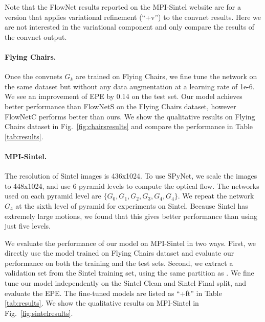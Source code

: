 \documentclass[10pt,twocolumn,letterpaper]{article}
\begin{document}
Note that the FlowNet results reported on the MPI-Sintel website are for a version that applies variational refinement (``+v'') to the convnet results.
Here we are not interested in the variational component and only compare the results of the convnet output.

\paragraph{Flying Chairs.}
Once the convnets $G_k$ are trained on Flying Chairs, we fine tune the network on the same dataset but without any data augmentation at a learning rate of 1e-6. 
We see an improvement of EPE by 0.14 on the test set. 
Our model achieves better performance than FlowNetS \cite{dosovitskiy2015flownet} on the Flying Chairs dataset, however FlowNetC \cite{dosovitskiy2015flownet} performs better than ours. 
We show the qualitative results on Flying Chairs dataset in Fig.~\ref{fig:chairsresults} and compare the performance in Table \ref{tab:results}.

\paragraph{MPI-Sintel.}
The resolution of Sintel images is 436x1024. 
To use SPyNet, we scale the images to 448x1024, and use 6 pyramid levels to compute the optical flow. The networks used on each pyramid level are $\{G_0, G_1, G_2, G_3, G_4, G_4\}$. We repeat the network $G_4$ at the sixth level of pyramid for experiments on Sintel. 
Because Sintel has extremely large motions, we found that this gives better performance than using just five levels.

We evaluate the performance of our model on MPI-Sintel \cite{Butler:ECCV:2012} in two ways.
First, we directly use the model trained on Flying Chairs dataset and evaluate our performance on both the training and the test sets. 
Second, we extract a validation set from the Sintel training set, using  the same partition as \cite{dosovitskiy2015flownet}. 
We fine tune our model independently on the Sintel Clean and Sintel Final split, and evaluate the EPE. 
The fine-tuned models are listed as ``+ft'' in Table \ref{tab:results}.
We show the qualitative results on MPI-Sintel in Fig.~\ref{fig:sintelresults}. 
\end{document}
